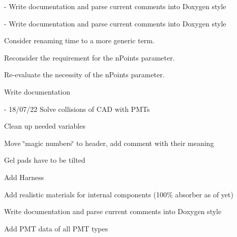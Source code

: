 \begin{DoxyRefList}
%
-\/ Write documentation and parse current comments into Doxygen style  
\item[Member \mbox{\hyperlink{classm_d_o_m_harness_aa192aa85786a58ad121567fbb7a78f06}{m\+DOMHarness\+::m\+DOMHarness}} (\mbox{\hyperlink{classm_d_o_m}{m\+DOM}} $\ast$p\+MDOM, \mbox{\hyperlink{class_input_data_manager}{Input\+Data\+Manager}} $\ast$p\+Data)]\label{todo__todo000008}%
%
-\/ Write documentation and parse current comments into Doxygen style  
\item[Member \mbox{\hyperlink{classmdom_s_n_tools_a97cdf95c246c690dd1592801cf9058b5}{mdom\+SNTools\+::findtime}} (G4double time, std\+::vector$<$ G4double $>$ timearray)]\label{todo__todo000012}%
%
Consider renaming \textquotesingle{}time\textquotesingle{} to a more generic term.  
\item[Member \mbox{\hyperlink{classmdom_s_n_tools_a88281615aad901f478eb4c9ddc03cb82}{mdom\+SNTools\+::Inverse\+Cumul}} (std\+::vector$<$ G4double $>$ xvals, std\+::vector$<$ G4double $>$ yvals, G4int n\+Points)]\label{todo__todo000010}%
%
Reconsider the requirement for the \textquotesingle{}n\+Points\textquotesingle{} parameter.  
\item[Member \mbox{\hyperlink{classmdom_s_n_tools_aa243dffac2c1455088546a19218819d8}{mdom\+SNTools\+::Inverse\+Cumul\+Algorithm}} (std\+::vector$<$ G4double $>$ x, std\+::vector$<$ G4double $>$ f, std\+::vector$<$ G4double $>$ a, std\+::vector$<$ G4double $>$ Fc, G4int n\+Points)]\label{todo__todo000011}%
%
Re-\/evaluate the necessity of the \textquotesingle{}n\+Points\textquotesingle{} parameter.  
\item[File \mbox{\hyperlink{_o_m_sim_d_e_g_g_harness_8hh}{OMSim\+DEGGHarness.hh}} ]\label{todo__todo000003}%
%
Write documentation


\item[File \mbox{\hyperlink{_o_m_sim_l_o_m18_8cc}{OMSim\+LOM18.cc}} ]\label{todo__todo000006}%
%
-\/ 18/07/22 Solve collisions of CAD with PMTs
\begin{DoxyItemize}
\item Clean up needed variables
\item Move \char`\"{}magic numbers\char`\"{} to header, add comment with their meaning
\item Gel pads have to be tilted
\item Add Harness
\item Add realistic materials for internal components (100\% absorber as of yet)
\item Write documentation and parse current comments into Doxygen style  
\end{DoxyItemize}
\item[Member \mbox{\hyperlink{class_o_m_sim_p_m_t_response_a0dd544847ff216a24aa8c528e76c9aed}{OMSim\+PMTResponse\+::create\+Histogram\+From\+Data}} (const std\+::string \&p\+File\+Path, const char $\ast$p\+TH2\+DName)]\label{todo__todo000002}%
%
Add PMT data of all PMT types 
\end{DoxyRefList}